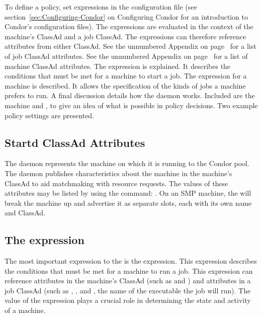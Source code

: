 To define a policy, set expressions in
the configuration file (see section~\ref{sec:Configuring-Condor} on
Configuring Condor for an introduction to Condor's
configuration files).
The expressions are evaluated in the context of the machine's ClassAd
and a job ClassAd.
The expressions can therefore reference attributes from either
ClassAd. 
See the unnumbered Appendix on page~\pageref{sec:Job-ClassAd-Attributes}
for a list of job ClassAd attributes.
See the unnumbered Appendix on page~\pageref{sec:Machine-ClassAd-Attributes}
for a list of machine ClassAd attributes.
The  expression is explained.
It describes the conditions that must be met for a machine to
start a job.
The  expression for a machine is described.
It allows the specification of
the kinds of jobs a machine prefers to run.
A final discussion details how the  daemon works.
Included are
the machine  and , to give
an idea of what is possible in policy decisions.
Two example policy settings are presented.

\subsection{\label{sec:Startd-Attributes}
Startd ClassAd Attributes}

The  daemon represents the machine on which it is running to
the Condor pool.  
The daemon publishes characteristics about the
machine in the machine's ClassAd to aid matchmaking with resource requests.
The values of these attributes may be listed by using the command:
.
On an SMP machine, the  will break the machine up and advertise
it as separate slots, each with its own name and ClassAd.


\subsection{\label{sec:Start-Expr}
The  expression}

The most important expression to the 
is the  expression.  
This expression describes the conditions that must be met for a
machine to run a job. 
This expression can reference attributes
in the machine's ClassAd (such as  and )
and attributes in a job ClassAd (such as
, , and , the name of the
executable the job will run).
The value of the  expression plays a crucial role in
determining the state and activity of a machine.

